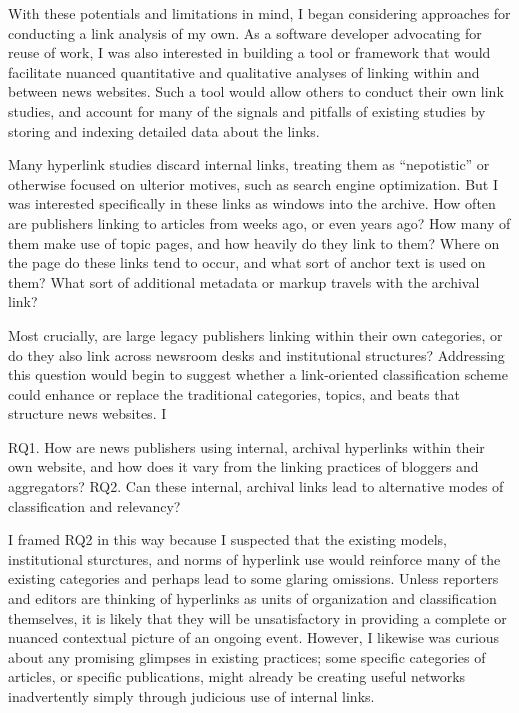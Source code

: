 With these potentials and limitations in mind, I began considering approaches for conducting a link analysis of my own. As a software developer advocating for reuse of work, I was also interested in building a tool or framework that would facilitate nuanced quantitative and qualitative analyses of linking within and between news websites. Such a tool would allow others to conduct their own link studies, and account for many of the signals and pitfalls of existing studies by storing and indexing detailed data about the links.


Many hyperlink studies discard internal links, treating them as ``nepotistic'' or otherwise focused on ulterior motives, such as search engine optimization. But I was interested specifically in these links as windows into the archive. How often are publishers linking to articles from weeks ago, or even years ago? How many of them make use of topic pages, and how heavily do they link to them? Where on the page do these links tend to occur, and what sort of anchor text is used on them? What sort of additional metadata or markup travels with the archival link?

Most crucially, are large legacy publishers linking within their own categories, or do they also link across newsroom desks and institutional structures? Addressing this question would begin to suggest whether a link-oriented classification scheme could enhance or replace the traditional categories, topics, and beats that structure news websites. I 

RQ1. How are news publishers using internal, archival hyperlinks within their own website, and how does it vary from the linking practices of bloggers and aggregators?
RQ2. Can these internal, archival links lead to alternative modes of classification and relevancy?

I framed RQ2 in this way because I suspected that the existing models, institutional sturctures, and norms of hyperlink use would reinforce many of the existing categories and perhaps lead to some glaring omissions. Unless reporters and editors are thinking of hyperlinks as units of organization and classification themselves, it is likely that they will be unsatisfactory in providing a complete or nuanced contextual picture of an ongoing event. However, I likewise was curious about any promising glimpses in existing practices; some specific categories of articles, or specific publications, might already be creating useful networks inadvertently simply through judicious use of internal links.

